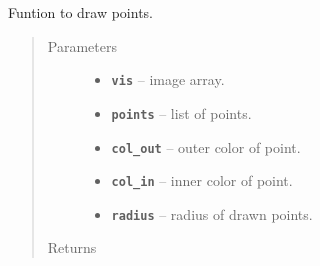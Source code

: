 \documentclass[letterpaper,10pt,english]{sphinxmanual}
\begin{document}
\begin{fulllineitems}
\label{RRtoolbox.lib:RRtoolbox.lib.image.drawcoorpoints}
Funtion to draw points.
\begin{quote}\begin{description}
\item[{Parameters}] \leavevmode\begin{itemize}
\item {} 
\textbf{\texttt{vis}} -- image array.

\item {} 
\textbf{\texttt{points}} -- list of points.

\item {} 
\textbf{\texttt{col\_out}} -- outer color of point.

\item {} 
\textbf{\texttt{col\_in}} -- inner color of point.

\item {} 
\textbf{\texttt{radius}} -- radius of drawn points.

\end{itemize}

\item[{Returns}] \leavevmode


\end{description}\end{quote}

\end{fulllineitems}

\end{document}
